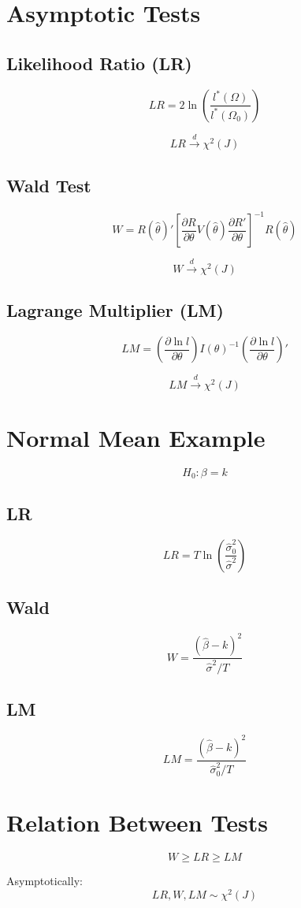 \section{Asymptotic Tests}

\subsection{Likelihood Ratio (LR)}

\[
LR = 2\ln\left(\frac{l^*(\Omega)}{l^*(\Omega_0)}\right)
\]

\[
LR \xrightarrow{d} \chi^2(J)
\]

\subsection{Wald Test}

\[
W = R(\hat{\theta})'
\left[
\frac{\partial R}{\partial \theta}
V(\hat{\theta})
\frac{\partial R'}{\partial \theta}
\right]^{-1}
R(\hat{\theta})
\]

\[
W \xrightarrow{d} \chi^2(J)
\]

\subsection{Lagrange Multiplier (LM)}

\[
LM =
\left(\frac{\partial \ln l}{\partial \theta}\right)
I(\theta)^{-1}
\left(\frac{\partial \ln l}{\partial \theta}\right)'
\]

\[
LM \xrightarrow{d} \chi^2(J)
\]

\section{Normal Mean Example}

\[
H_0: \beta = k
\]

\subsection{LR}

\[
LR = T \ln\left(\frac{\hat{\sigma}_0^2}{\hat{\sigma}^2}\right)
\]

\subsection{Wald}

\[
W = \frac{(\hat{\beta} - k)^2}{\hat{\sigma}^2/T}
\]

\subsection{LM}

\[
LM = \frac{(\hat{\beta} - k)^2}{\hat{\sigma}_0^2/T}
\]

\section{Relation Between Tests}

\[
W \ge LR \ge LM
\]

Asymptotically:
\[
LR, W, LM \sim \chi^2(J)
\]